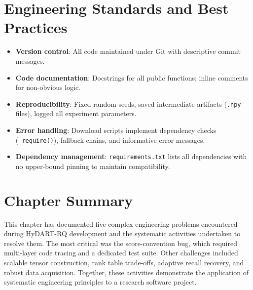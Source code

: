 \section{Engineering Standards and Best Practices}

\begin{itemize}
  \item \textbf{Version control}: All code maintained under Git with descriptive commit messages.
  \item \textbf{Code documentation}: Docstrings for all public functions; inline comments for non-obvious logic.
  \item \textbf{Reproducibility}: Fixed random seeds, saved intermediate artifacts (\texttt{.npy} files), logged all experiment parameters.
  \item \textbf{Error handling}: Download scripts implement dependency checks (\texttt{\_require()}), fallback chains, and informative error messages.
  \item \textbf{Dependency management}: \texttt{requirements.txt} lists all dependencies with no upper-bound pinning to maintain compatibility.
\end{itemize}

\section{Chapter Summary}

This chapter has documented five complex engineering problems encountered during HyDART-RQ development and the systematic activities undertaken to resolve them. The most critical was the score-convention bug, which required multi-layer code tracing and a dedicated test suite. Other challenges included scalable tensor construction, rank table trade-offs, adaptive recall recovery, and robust data acquisition. Together, these activities demonstrate the application of systematic engineering principles to a research software project.
